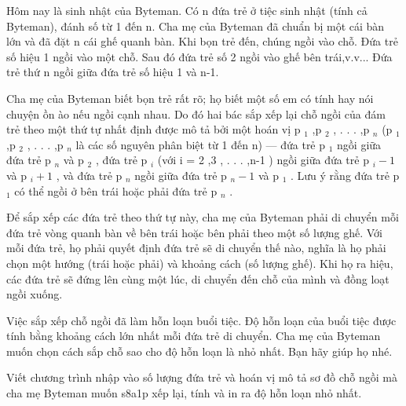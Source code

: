 Hôm nay là sinh nhật của Byteman. Có n đứa trẻ ở tiệc sinh nhật (tính cả Byteman), đánh số từ 1 đến n. Cha mẹ của Byteman đã chuẩn bị một cái bàn lớn và đã đặt n cái ghế quanh bàn. Khi bọn trẻ đến, chúng ngồi vào chỗ. Đứa trẻ số hiệu 1 ngồi vào một chỗ. Sau đó đứa trẻ số 2 ngồi vào ghế bên trái,v.v... Đứa trẻ thứ n ngồi giữa đứa trẻ số hiệu 1 và n-1.  

   Cha mẹ của Byteman biết bọn trẻ rất rõ; họ biết một số em có tính hay nói chuyện ồn ào nếu ngồi cạnh nhau. Do đó hai bác sắp xếp lại chỗ ngồi của đám trẻ theo một thứ tự nhất định được mô tả bởi một hoán vị p   $_    1   $   ,p   $_    2   $   , . . . ,p   $_    n   $   (p   $_    1   $   ,p   $_    2   $   , . . . ,p   $_    n   $   là các số nguyên phân biệt từ 1 đến n) — đứa trẻ p   $_    1   $   ngồi giữa đứa trẻ p   $_    n   $   và p   $_    2   $   , đứa trẻ p   $_    i   $   (với i = 2 ,3 , . . . ,n-1 ) ngồi giữa đứa trẻ p   $_    i-1   $   và p   $_    i+1   $   , và đứa trẻ p   $_    n   $   ngồi giữa đứa trẻ p   $_    n-1   $   và p   $_    1   $   . Lưu ý rằng đứa trẻ p   $_    1   $   có thể ngồi ở bên trái hoặc phải đứa trẻ p   $_    n   $   .  

   Để sắp xếp các đứa trẻ theo thứ tự này, cha mẹ của Byteman phải di chuyển mỗi đứa trẻ vòng quanh bàn về bên trái hoặc bên phải theo một số lượng ghế. Với mỗi đứa trẻ, họ phải quyết định đứa trẻ sẽ di chuyển thế nào, nghĩa là họ phải chọn một hướng (trái hoặc phải) và khoảng cách (số lượng ghế). Khi họ ra hiệu, các đứa trẻ sẽ đứng lên cùng một lúc, di chuyển đến chỗ của mình và đồng loạt ngồi xuống.  

   Việc sắp xếp chỗ ngồi đã làm hỗn loạn buổi tiệc. Độ hỗn loạn của buổi tiệc được tính bằng khoảng cách lớn nhất mỗi đứa trẻ di chuyển. Cha mẹ của Byteman muốn chọn cách sắp chỗ sao cho độ hỗn loạn là nhỏ nhất. Bạn hãy giúp họ nhé.  

Viết chương trình nhập vào số lượng đứa trẻ và hoán vị mô tả sơ đồ chỗ ngồi mà cha mẹ Byteman muốn s8a1p xếp lại, tính và in ra độ hỗn loạn nhỏ nhất.